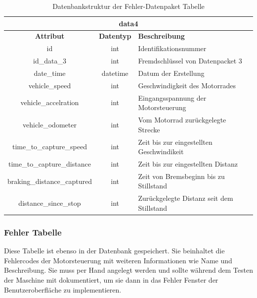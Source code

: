 \begin{table}[H]
	\begin{center}
		\begin{tabular}{|c|c|l|}
			\hline
			\multicolumn{3}{|c|}{\textbf{data4}} \\ \hline
			\textbf{Attribut}           & \textbf{Datentyp} & \textbf{Beschreibung}                     \\ \hline
			id                          & int               & Identifikationsnummer                     \\ \hline
			id\_data\_3                 & int               & Fremdschlüssel von Datenpacket 3          \\ \hline
			date\_time                  & datetime          & Datum der Erstellung                      \\ \hline
			vehicle\_speed              & int               & Geschwindigkeit des Motorrades            \\ \hline
			vehicle\_accelration        & int               & Eingangsspannung der Motorsteuerung       \\ \hline
			vehicle\_odometer           & int               & Vom Motorrad zurückgelegte Strecke        \\ \hline
			time\_to\_capture\_speed    & int               & Zeit bis zur eingestellten Geschwindikeit \\ \hline
			time\_to\_capture\_distance & int               & Zeit bis zur eingestellten Distanz        \\ \hline
			braking\_distance\_captured & int               & Zeit von Bremsbeginn bis zu Stillstand     \\ \hline
			distance\_since\_stop       & int               & Zurückgelegte Distanz seit dem Stillstand \\ \hline
		\end{tabular}
		\caption{Datenbankstruktur der Fehler-Datenpaket Tabelle}
		\label{tab:data4}
	\end{center}
\end{table}

\subsubsection{Fehler Tabelle}

Diese Tabelle ist ebenso in der Datenbank gespeichert. Sie beinhaltet die Fehlercodes der Motorsteuerung mit weiteren Informationen wie Name und Beschreibung. Sie muss per Hand angelegt werden und sollte während dem Testen der Maschine mit dokumentiert, um sie dann in das Fehler Fenster der Benutzeroberfläche zu implementieren.

